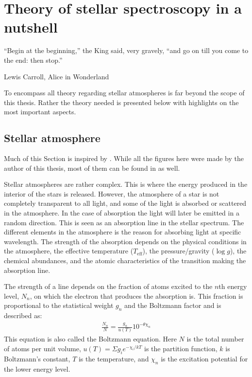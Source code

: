 \chapter{Theory of stellar spectroscopy in a nutshell}
\label{cha:theory}

\epigraph{``Begin at the beginning,'' the King said, very gravely, ``and go on till you come to the
          end: then stop.''}{Lewis Carroll, Alice in Wonderland}

To encompass all theory regarding stellar atmospheres is far beyond the scope of this thesis. Rather
the theory needed is presented below with highlights on the most important aspects.


\section{Stellar atmosphere}
\label{sec:stellar_atmosphere}

Much of this Section is inspired by \citet{Gray2006}. While all the figures here were made by the
author of this thesis, most of them can be found in \citet{Gray2006} as well.

Stellar atmospheres are rather complex. This is where the energy produced in the interior of the
stars is released. However, the atmosphere of a star is not completely transparent to all light, and
some of the light is absorbed or scattered in the atmosphere. In the case of absorption the light
will later be emitted in a random direction. This is seen as an absorption line in the stellar
spectrum. The different elements in the atmosphere is the reason for absorbing light at specific
wavelength. The strength of the absorption depends on the physical conditions in the atmosphere, the
effective temperature ($T_\mathrm{eff}$), the pressure/gravity ($\log g$), the chemical abundances,
and the atomic characteristics of the transition making the absorption line.

The strength of a line depends on the fraction of atoms excited to the $n$th energy level, $N_n$, on
which the electron that produces the absorption is. This fraction is proportional to the statistical
weight $g_n$ and the Boltzmann factor and is described as:
\begin{align}
    \frac{N_n}{N} = \frac{g_n}{u(T)} 10^{-\theta\chi_n} \tag*{Boltzmann}\label{eq:boltzmann}
\end{align}
This equation is also called the Boltzmann equation. Here $N$ is the total number of atoms per unit
volume, $u(T)=\Sigma g_i e^{-\chi_i/kT}$ is the partition function, $k$ is Boltzmann's constant, $T$
is the temperature, and $\chi_n$ is the excitation potential for the lower energy level.

